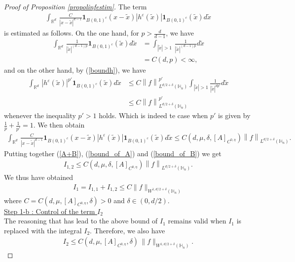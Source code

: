 \documentclass[11pt, reqno]{amsart}
\theoremstyle{definition}
\theoremstyle{remark}
\numberwithin{equation}{section}
\begin{document}
\begin{proof}[Proof of Proposition \textup{\ref{propolinfestim}}]
		
		The term 
		\begin{align*}
			\int_{\mathbb{R}^d} \,  \frac{C}{|x- \tilde{x}|^{d-1}}   \mathbf{1}_{B(0,1)^c} (x- \tilde{x})|h^\varepsilon(\tilde{x}) | \mathbf{1}_{B(0,1)^c} (\tilde{x}) d\tilde{x}
		\end{align*} 
		is estimated as follows. On the one hand, for $p>\frac{d}{d-1}$,  we have
		\begin{align*}
			\int_{\mathbb{R}^d} \,  \frac{1}{|\tilde{x}|^{(d-1)p}}  \mathbf{1}_{B(0,1)^c} (\tilde{x}) d\tilde{x}&=  \int_{| \tilde{x}|>1} \,  \frac{1}{|\tilde{x}|^{(d-1)p}}  d\tilde{x}\\
			&= C(d,p)<\infty, 
		\end{align*} 
		and on the other hand,  by (\ref{boundh}), we have 
		\begin{align*}
			\int_{\mathbb{R}^d} \,  |h^\varepsilon(\tilde{x}) |^{p'} \mathbf{1}_{B(0,1)^c} (\tilde{x}) d\tilde{x} & \leq  C\left\|f\right\|^{p'}_{L^{d/2+\delta}(\mathbb{H}_n)}	\int_{|\tilde{x}|>1} \frac{1}{|\tilde{x}|^{dp'}} d\tilde{x} \\
			& \leq  C\left\|f\right\|^{p'}_{L^{d/2+\delta}(\mathbb{H}_n)}	
		\end{align*}
		whenever the inequality $p'>1$ holds. Which is indeed te case when $p'$ is given by $\frac{1}{p}+\frac{1}{p'}=1$. We then obtain 
		\begin{align}
			\int_{\mathbb{R}^d} \,  \frac{C}{|x- \tilde{x}|^{d-1}}   \mathbf{1}_{B(0,1)^c} (x- \tilde{x})|h^\varepsilon(\tilde{x}) | \mathbf{1}_{B(0,1)^c} (\tilde{x}) d\tilde{x}\leq  C(d,\mu,\delta,[A]_{C^{0,\eta}})\left\|f\right\|^{}_{L^{d/2+\delta}(\mathbb{H}_n)}.\label{bound_of_B}
		\end{align} 
		Putting together (\ref{A+B}), (\ref{bound_of_A}) and (\ref{bound_of_B}) we get 
		\begin{align}
			I_{1,2}\leq  C(d,\mu,\delta,[A]_{C^{0,\eta}})\left\|f\right\|^{}_{L^{d/2+\delta}(\mathbb{H}_n)}.
		\end{align}
		We thus have obtained 
		\begin{align*}
			I_1 =I_{1,1}+I_{1,2}\leq C \|f\|_{W^{1,d/2+\delta}(\mathbb{H}_n)}
		\end{align*}
		where 	$C= C(d, \mu,[A]_{C^{0,\eta}},\delta)>0$	 and $\delta\in(0,d/2)$.\\
		
		
		
		
		\noindent \underline{Step 1-b : Control of the term $I_2$} \\The reasoning that has lead to the above bound of $I_1$ remains valid when $I_1$ is replaced with the integral $I_2$. Therefore, we also have
		\begin{align*}
			I_2\leq C(d,\mu,[A]_{C^{0,\eta}},\delta)\, \|f\|_{W^{1,d/2+\delta}(\mathbb{H}_n)}.
		\end{align*}
		

\end{proof}
\end{document}
